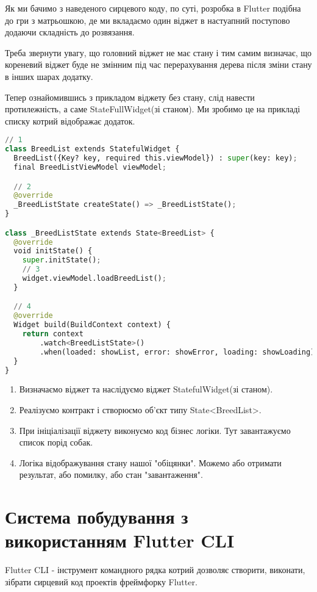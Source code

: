 Як ми бачимо з наведеного сирцевого коду, по суті, розробка в Flutter подібна до гри з матрьошкою,
де ми вкладаємо один віджет в настуапний поступово додаючи складність до розвязання.

Треба звернути увагу, що головний віджет не має стану і тим самим визначає, що кореневий віджет буде не змінним
під час перерахування дерева після зміни стану в інших шарах додатку.

Тепер ознайомившись з прикладом віджету без стану, слід навести протилежність, а саме StateFullWidget(зі станом).
Ми зробимо це на прикладі списку котрий відображає додаток.

\begin{lstlisting}[style=light, language=Python,label={lst:flutter_app_widget},caption=Flutter StatefulWidget]
// 1
class BreedList extends StatefulWidget {
  BreedList({Key? key, required this.viewModel}) : super(key: key);
  final BreedListViewModel viewModel;

  // 2
  @override
  _BreedListState createState() => _BreedListState();
}

class _BreedListState extends State<BreedList> {
  @override
  void initState() {
    super.initState();
    // 3
    widget.viewModel.loadBreedList();
  }

  // 4
  @override
  Widget build(BuildContext context) {
    return context
        .watch<BreedListState>()
        .when(loaded: showList, error: showError, loading: showLoading);
  }
}
\end{lstlisting}

\begin{enumerate}
    \item Визначаємо віджет та наслідуємо віджет StatefulWidget(зі станом).
    \item Реалізуємо контракт і створюємо об'єкт типу State<BreedList>.
    \item При ініціалізації віджету виконуємо код бізнес логіки. Тут завантажуємо список порід собак.
    \item Логіка відображування стану нашої "обіцянки". Можемо або отримати результат, або помилку, або стан "завантаження".
\end{enumerate}


\section{Система побудування з використанням Flutter CLI}
\label{section.3.2}
Flutter CLI - інструмент командного рядка котрий дозволяє створити, виконати, зібрати сирцевий код проектів фреймфорку Flutter.

